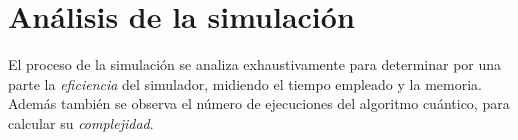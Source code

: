 %
%
%


\chapter{Análisis de la simulación}

El proceso de la simulación se analiza exhaustivamente para determinar por una 
parte la \textit{eficiencia} del simulador, midiendo el tiempo empleado y la 
memoria. Además también se observa el número de ejecuciones del algoritmo 
cuántico, para calcular su \textit{complejidad}.

%

